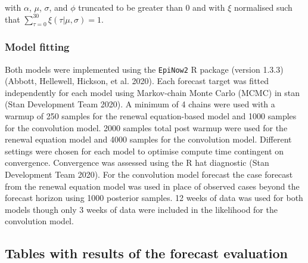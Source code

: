 \documentclass[
]{article}
\begin{document}
with \(\alpha\), \(\mu\), \(\sigma\), and \(\phi\) truncated to be greater than 0 and with \(\xi\) normalised such that \(\sum_{\tau = 0}^{30} \xi(\tau | \mu, \sigma) = 1\).

\hypertarget{model-fitting}{%
\subsubsection{Model fitting}\label{model-fitting}}

Both models were implemented using the \texttt{EpiNow2} R package (version 1.3.3) (Abbott, Hellewell, Hickson, et al. 2020). Each forecast target was fitted independently for each model using Markov-chain Monte Carlo (MCMC) in stan (Stan Development Team 2020). A minimum of 4 chains were used with a warmup of 250 samples for the renewal equation-based model and 1000 samples for the convolution model. 2000 samples total post warmup were used for the renewal equation model and 4000 samples for the convolution model. Different settings were chosen for each model to optimise compute time contingent on convergence. Convergence was assessed using the R hat diagnostic (Stan Development Team 2020). For the convolution model forecast the case forecast from the renewal equation model was used in place of observed cases beyond the forecast horizon using 1000 posterior samples. 12 weeks of data was used for both models though only 3 weeks of data were included in the likelihood for the convolution model.

\clearpage

\hypertarget{tables-with-results-of-the-forecast-evaluation}{%
\subsection{Tables with results of the forecast evaluation}\label{tables-with-results-of-the-forecast-evaluation}}
\end{document}
